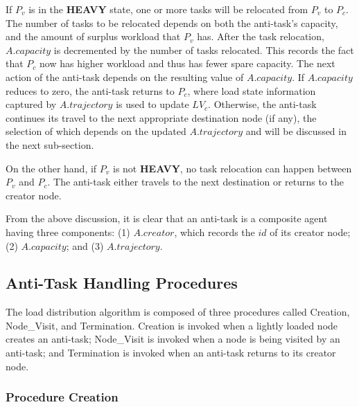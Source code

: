 If $P_v$ is in the {\bf HEAVY} state,
one or more tasks will be relocated from $P_v$ to $P_c$.
The number of tasks to be relocated depends on both
the anti-task's capacity,
and the amount of surplus workload that $P_v$ has.
After the task relocation,
$A.capacity$ is decremented by the number of tasks relocated.
This records the fact that
$P_c$ now has higher workload and thus has fewer spare capacity.
%
The next action of the anti-task depends on
the resulting value of $A.capacity$.
If $A.capacity$ reduces to zero, the anti-task returns to $P_c$,
where load state information captured by $A.trajectory$
is used to update $LV_c$.
Otherwise, the anti-task continues its travel
to the next appropriate destination node (if any),
the selection of which depends on the updated $A.trajectory$ and 
will be discussed in the next sub-section.

On the other hand, if $P_v$ is not {\bf HEAVY},
no task relocation can happen between $P_v$ and $P_c$.
The anti-task either travels to the next destination
or returns to the creator node.

From the above discussion, it is clear that
an anti-task is a composite agent having three components:
(1) $A.creator$, which records the $id$ of its creator node;
(2) $A.capacity$; and
(3) $A.trajectory$.




\subsection {Anti-Task Handling Procedures}

The load distribution algorithm is composed of three
procedures called {\sc Creation}, {\sc Node\_Visit}, and {\sc Termination}.
{\sc Creation} is invoked
when a lightly loaded node creates an anti-task;
{\sc Node\_Visit} is invoked when a node is being
visited by an anti-task; and {\sc Termination} is invoked
when an anti-task returns to its creator node.



\subsubsection {Procedure \sc Creation}

